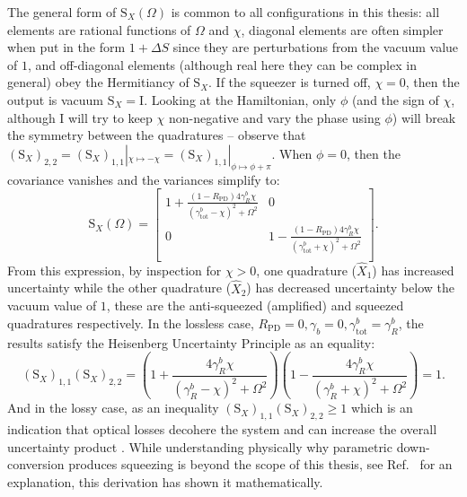 The general form of $\text{S}_X(\Omega)$ is common to all configurations in this thesis: all elements are rational functions of $\Omega$ and $\chi$, diagonal elements are often simpler when put in the form $1 + \Delta S$ since they are perturbations from the vacuum value of $1$, and off-diagonal elements (although real here they can be complex in general) obey the Hermitiancy of $\text{S}_X$. If the squeezer is turned off, $\chi=0$, then the output is vacuum $\text{S}_X=\text{I}$. Looking at the Hamiltonian, only $\phi$ (and the sign of $\chi$, although I will try to keep $\chi$ non-negative and vary the phase using $\phi$) will break the symmetry between the quadratures  -- observe that $(\text{S}_X)_{2,2}=(\text{S}_X)_{1,1}|_{\chi\mapsto-\chi}=(\text{S}_X)_{1,1}|_{\phi\mapsto\phi+\pi}$. When $\phi=0$, then the covariance vanishes and the variances simplify to: \begin{equation} \label{eq:dOPO_fixed_phase}
\text{S}_X(\Omega)=\left[
\begin{array}{cc}
 1+\frac{(1-R_\text{PD})4 \gamma^b_R \chi}{\left({\gamma^b_\text{tot}}-\chi\right)^2+\Omega ^2}
 & 0 \\
 0
 & 1-\frac{(1-R_\text{PD})4 \gamma^b_R \chi}{\left({\gamma^b_\text{tot}}+\chi\right)^2+\Omega ^2} \\
\end{array}
\right].\end{equation} From this expression, by inspection for $\chi>0$, one quadrature ($\hat X_1$) has increased uncertainty while the other quadrature ($\hat X_2$) has decreased uncertainty below the vacuum value of $1$, these are the anti-squeezed (amplified) and squeezed quadratures respectively. %
In the lossless case, $R_\text{PD}=0, \gamma_b=0, \gamma^b_\text{tot}=\gamma^b_R$, the results satisfy the Heisenberg Uncertainty Principle as an equality: \begin{equation}\label{eq:dOPO_HUP_sat}(\text{S}_X)_{1,1}(\text{S}_X)_{2,2}=\left(1+\frac{4 \gamma^b_R \chi}{\left(\gamma^b_R-\chi\right)^2+\Omega ^2}\right)\left(1-\frac{4 \gamma^b_R \chi}{\left(\gamma^b_R+\chi\right)^2+\Omega ^2}\right)=1.\end{equation} And in the lossy case, as an inequality $(\text{S}_X)_{1,1}(\text{S}_X)_{2,2}\geq1$  which is an indication that optical losses decohere the system and can increase the overall uncertainty product . While understanding physically why parametric down-conversion produces squeezing is beyond the scope of this thesis, see Ref.~\cite{} for an explanation, this derivation has shown it mathematically.

